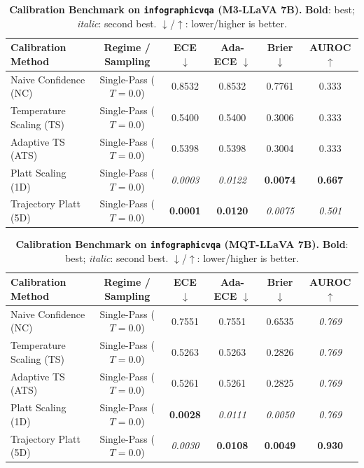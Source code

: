 \begin{table}[t]
\setlength{\tabcolsep}{4pt}
\renewcommand{\arraystretch}{1.05}
\centering
\footnotesize
\begin{tabular}{lccccc}
\toprule
\textbf{Calibration Method} & \textbf{Regime / Sampling} & \textbf{ECE} $\downarrow$ & \textbf{Ada-ECE} $\downarrow$ & \textbf{Brier} $\downarrow$ & \textbf{AUROC} $\uparrow$ \\
\midrule
Naive Confidence (NC) & Single-Pass ($T = 0.0$) & 0.8532 & 0.8532 & 0.7761 & 0.333 \\
Temperature Scaling (TS) & Single-Pass ($T = 0.0$) & 0.5400 & 0.5400 & 0.3006 & 0.333 \\
Adaptive TS (ATS) & Single-Pass ($T = 0.0$) & 0.5398 & 0.5398 & 0.3004 & 0.333 \\
Platt Scaling (1D) & Single-Pass ($T = 0.0$) & \textit{0.0003} & \textit{0.0122} & \textbf{0.0074} & \textbf{0.667} \\
Trajectory Platt (5D) & Single-Pass ($T = 0.0$) & \textbf{0.0001} & \textbf{0.0120} & \textit{0.0075} & \textit{0.501} \\
\bottomrule
\end{tabular}
\caption{\textbf{Calibration Benchmark on \texttt{infographicvqa} (M3-LLaVA 7B).} \textbf{Bold}: best; \textit{italic}: second best. $\downarrow$/$\uparrow$: lower/higher is better.}
\label{tab:benchmark_m3_infographicvqa}
\end{table}

\begin{table}[t]
\setlength{\tabcolsep}{4pt}
\renewcommand{\arraystretch}{1.05}
\centering
\footnotesize
\begin{tabular}{lccccc}
\toprule
\textbf{Calibration Method} & \textbf{Regime / Sampling} & \textbf{ECE} $\downarrow$ & \textbf{Ada-ECE} $\downarrow$ & \textbf{Brier} $\downarrow$ & \textbf{AUROC} $\uparrow$ \\
\midrule
Naive Confidence (NC) & Single-Pass ($T = 0.0$) & 0.7551 & 0.7551 & 0.6535 & \textit{0.769} \\
Temperature Scaling (TS) & Single-Pass ($T = 0.0$) & 0.5263 & 0.5263 & 0.2826 & \textit{0.769} \\
Adaptive TS (ATS) & Single-Pass ($T = 0.0$) & 0.5261 & 0.5261 & 0.2825 & \textit{0.769} \\
Platt Scaling (1D) & Single-Pass ($T = 0.0$) & \textbf{0.0028} & \textit{0.0111} & \textit{0.0050} & \textit{0.769} \\
Trajectory Platt (5D) & Single-Pass ($T = 0.0$) & \textit{0.0030} & \textbf{0.0108} & \textbf{0.0049} & \textbf{0.930} \\
\bottomrule
\end{tabular}
\caption{\textbf{Calibration Benchmark on \texttt{infographicvqa} (MQT-LLaVA 7B).} \textbf{Bold}: best; \textit{italic}: second best. $\downarrow$/$\uparrow$: lower/higher is better.}
\label{tab:benchmark_mqt_infographicvqa}
\end{table}
